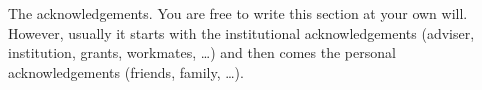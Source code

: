 
The acknowledgements. You are free to write this section at your own will.  However, usually it starts with the institutional acknowledgements (adviser, institution, grants, workmates, \ldots) and then comes the personal acknowledgements (friends, family, \ldots).

